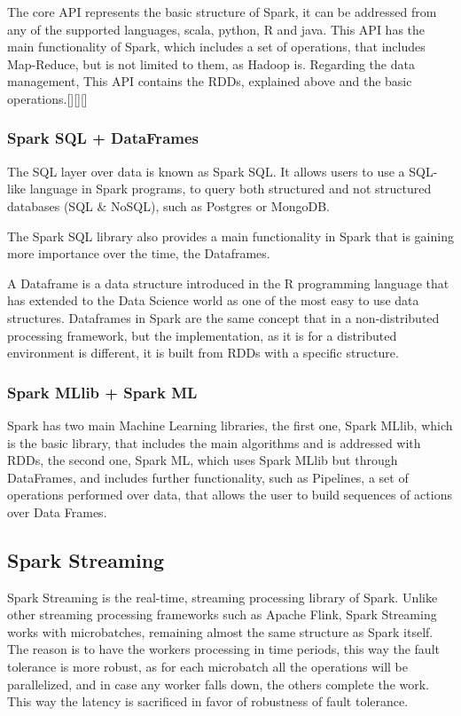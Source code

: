 \documentclass[11pt]{book} %
\begin{document}
          The core API represents the basic structure of Spark, it can be addressed from any of the supported languages, scala, python, R and java. This API has the main functionality of Spark, which includes a set of operations, that includes Map-Reduce, but is not limited to them, as Hadoop is.
          Regarding the data management, This API contains the RDDs, explained above and the basic operations.[][][]

        \subsubsection{Spark SQL + DataFrames}

          The SQL layer over data is known as Spark SQL. It allows users to use a SQL-like language in Spark programs, to query both structured and not structured databases (SQL \& NoSQL), such as Postgres or MongoDB.

          The Spark SQL library also provides a main functionality in Spark that is gaining more importance over the time, the Dataframes.

          A Dataframe is a data structure introduced in the R programming language that has extended to the Data Science world as one of the most easy to use data structures. Dataframes in Spark are the same concept that in a non-distributed processing framework, but the implementation, as it is for a distributed environment is different, it is built from RDDs with a specific structure.

        \subsubsection{Spark MLlib + Spark ML}

          Spark has two main Machine Learning libraries, the first one, Spark MLlib, which is the basic library, that includes the main algorithms and is addressed with RDDs, the second one, Spark ML, which uses Spark MLlib but through DataFrames, and includes further functionality, such as Pipelines, a set of operations performed over data, that allows the user to build sequences of actions over Data Frames.

        \subsection{Spark Streaming}

          Spark Streaming is the real-time, streaming processing library of Spark. Unlike other streaming processing frameworks such as Apache Flink, Spark Streaming works with microbatches, remaining almost the same structure as Spark itself. The reason is to have the workers processing in time periods, this way the fault tolerance is more robust, as for each microbatch all the operations will be parallelized, and in case any worker falls down, the others complete the work. This way the latency is sacrificed in favor of robustness of fault tolerance.
\end{document}
